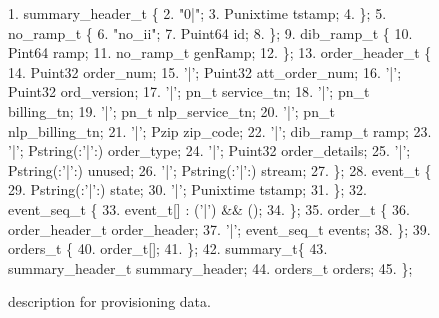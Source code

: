 \begin{figure}
\begin{code}
\begin{scriptsize}
{ 1}.   summary\_header\_t \{
{ 2}.  "0|";
{ 3}.  Punixtime tstamp;
{ 4}. \};
{ 5}.  no\_ramp\_t \{
{ 6}.  "no\_ii";
{ 7}.  Puint64 id;
{ 8}. \};
{ 9}.  dib\_ramp\_t \{
{10}.   Pint64     ramp;
{11}.   no\_ramp\_t  genRamp;
{12}. \};
{13}.  order\_header\_t \{
{14}.        Puint32             order\_num;
{15}.  '|';  Puint32             att\_order\_num;
{16}.  '|';  Puint32             ord\_version;
{17}.  '|';   pn\_t           service\_tn;
{18}.  '|';   pn\_t           billing\_tn;
{19}.  '|';   pn\_t           nlp\_service\_tn;
{20}.  '|';   pn\_t           nlp\_billing\_tn;
{21}.  '|';   Pzip           zip\_code;
{22}.  '|';  dib\_ramp\_t          ramp;
{23}.  '|';  Pstring(:'|':)      order\_type;
{24}.  '|';  Puint32             order\_details;
{25}.  '|';  Pstring(:'|':)      unused;
{26}.  '|';  Pstring(:'|':)      stream;
{27}. \};
{28}.  event\_t \{
{29}.        Pstring(:'|':)    state;   
{30}.   '|'; Punixtime         tstamp;
{31}. \};
{32}.  event\_seq\_t \{
{33}.   event\_t[] : ('|') && ();
{34}. \};
{35}.   order\_t \{
{36}.        order\_header\_t  order\_header;
{37}.   '|'; event\_seq\_t     events;
{38}. \};
{39}.  orders\_t \{
{40}.   order\_t[];
{41}. \};
{42}.   summary\_t\{
{43}.   summary\_header\_t  summary\_header;
{44}.   orders\_t          orders;
{45}. \};
\end{scriptsize}
\end{code}
\caption{\label{figure:dibbler}\pads{} description for \dibbler{} provisioning data.\vspace{-1cm}}
\end{figure}




